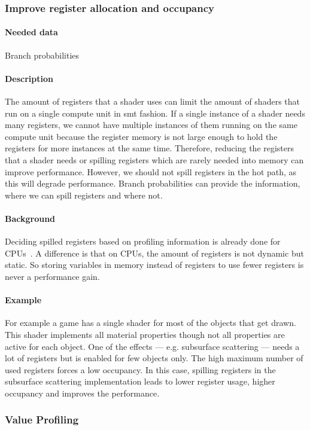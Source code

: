 \subsubsection{Improve register allocation and occupancy}
\paragraph{Needed data} Branch probabilities
\paragraph{Description} The amount of registers that a shader uses can limit the amount of shaders that run on a single compute unit in \gls{smt} fashion. If a single instance of a shader needs many registers, we cannot have multiple instances of them running on the same compute unit because the register memory is not large enough to hold the registers for more instances at the same time.
Therefore, reducing the registers that a shader needs or spilling registers which are rarely needed into memory can improve performance. However, we should not spill registers in the hot path, as this will degrade performance.
Branch probabilities can provide the information, where we can spill registers and where not.
\paragraph{Background} Deciding spilled registers based on profiling information is already done for CPUs~\cite{Bakhvalov2019}. A difference is that on CPUs, the amount of registers is not dynamic but static. So storing variables in memory instead of registers to use fewer registers is never a performance gain.
\paragraph{Example} For example a game has a single shader for most of the objects that get drawn. This shader implements all material properties though not all properties are active for each object.
One of the effects --- e.g. subsurface scattering --- needs a lot of registers but is enabled for few objects only. The high maximum number of used registers forces a low occupancy.
In this case, spilling registers in the subsurface scattering implementation leads to lower register usage, higher occupancy and improves the performance.

\subsubsection{Value Profiling}
